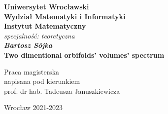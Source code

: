 \newpage
\thispagestyle{empty}
\begin{center}
\textbf{\large Uniwersytet Wrocławski\\
Wydział Matematyki i Informatyki\\
Instytut Matematyczny}\\
\textit{\large specjalność: teoretyczna}\\
\vspace{4cm}
\textbf{\textit{\large Bartosz Sójka}\\
\vspace{0.5cm}
{\Large Two dimentional orbifolds' volumes' spectrum}}\\
\end{center}
\vspace{3cm}
{\large \hspace*{6.5cm}Praca magisterska\\
\hspace*{6.5cm}napisana pod kierunkiem\\
\hspace*{6.5cm}prof. dr hab. Tadeusza Januszkiewicza }\\
\vfill
\begin{center}
{\large Wrocław 2021-2023}\\
\end{center}
